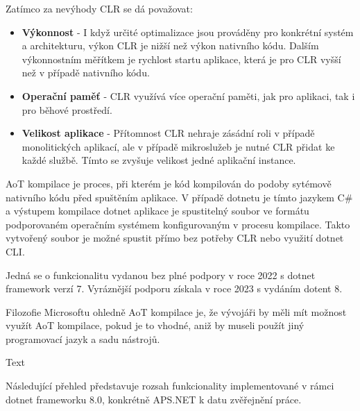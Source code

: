 Zatímco za nevýhody CLR se dá považovat:
\begin{itemize}
    \item  \textbf{Výkonnost} - I když určité optimalizace jsou prováděny pro konkrétní systém a architekturu, výkon CLR je nižší než výkon nativního kódu. Dalším výkonnostním měřítkem je rychlost startu aplikace, která je pro CLR vyšší než v případě nativního kódu.
    \item \textbf{Operační paměť} - CLR využívá více operační paměti, jak pro aplikaci, tak i pro běhové prostředí.
    \item \textbf{Velikost aplikace} - Přítomnost CLR nehraje zásádní roli v případě monolitických aplikací, ale v případě mikroslužeb je nutné CLR přidat ke každé službě. Tímto se zvyšuje velikost jedné aplikační instance.
\end{itemize}

AoT kompilace je proces, při kterém je kód kompilován do podoby sytémově nativního kódu před spuštěním aplikace. V případě dotnetu je tímto jazykem C\# a výstupem kompilace dotnet aplikace je spustitelný soubor ve formátu podporovaném operačním systémem konfigurovaným v procesu kompilace. Takto vytvořený soubor je možné spustit přímo bez potřeby CLR nebo využití dotnet CLI. 

Jedná se o funkcionalitu vydanou bez plné podpory v roce 2022 s dotnet framework verzí 7. Vyráznější podporu získala v roce 2023 s vydáním dotent 8. \cite{aot}

Filozofie Microsoftu ohledně AoT kompilace je, že vývojáři by měli mít možnost využít AoT kompilace, pokud je to vhodné, aniž by museli použít jiný programovací jazyk a sadu nástrojů.

Text





Následující přehled představuje rozsah funkcionality implementované v rámci dotnet frameworku 8.0, konkrétně APS.NET k datu zvěřejnění práce.

